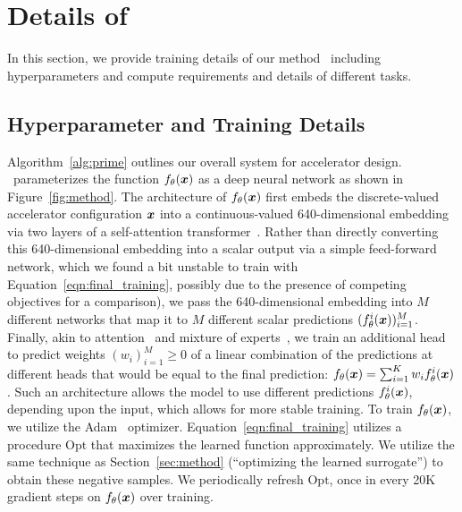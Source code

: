 \section{Details of \primemethodname}
\label{app:details}
%
In this section, we provide training details of our method \primemethodname\ including hyperparameters and compute requirements and details of different tasks. 
%
\subsection{Hyperparameter and Training Details}
\label{sec:practical_implementation}
%
Algorithm~\ref{alg:prime} outlines our overall system for accelerator design.
%
\primemethodname\ parameterizes the function $f_\theta({\boldsymbol{x}})$ as a deep neural network as shown in Figure~\ref{fig:method}. 
%
The architecture of $f_\theta({\boldsymbol{x}})$ first embeds the discrete-valued accelerator configuration ${\boldsymbol{x}}$ into a continuous-valued 640-dimensional embedding via two layers of a self-attention transformer~\citep{vaswani2017attention}. 
%
Rather than directly converting this 640-dimensional embedding into a scalar output via a simple feed-forward network, which we found a bit unstable to train with Equation~\ref{eqn:final_training}, possibly due to the presence of competing objectives for a comparison), we pass the 640-dimensional embedding into $M$ different networks that map it to $M$ different scalar predictions $(f^i_\theta({\boldsymbol{x}}))_{i=1}^M$. 
%
Finally, akin to attention~\citep{vaswani2017attention} and mixture of experts~\citep{shazeer2017outrageously}, we train an additional head to predict weights $(w_i)_{i=1}^M \geq 0$ of a linear combination of the predictions at different heads that would be equal to the final prediction: $f_\theta({\boldsymbol{x}}) = \sum_{i=1}^K w_i f^i_\theta({\boldsymbol{x}})$.
%
Such an architecture allows the model to use different predictions $f^i_\theta({\boldsymbol{x}})$, depending upon the input, which allows for more stable training. To train $f_\theta({\boldsymbol{x}})$, we utilize the Adam~\citep{kingma2014adam} optimizer.
%
Equation~\ref{eqn:final_training} utilizes a procedure $\mathrm{Opt}$ that maximizes the learned function approximately. We utilize the same technique as Section~\ref{sec:method} (``optimizing the learned surrogate'') to obtain these negative samples.
%
We periodically refresh $\mathrm{Opt}$, once in every 20K gradient steps on $f_\theta({\boldsymbol{x}})$ over training.
